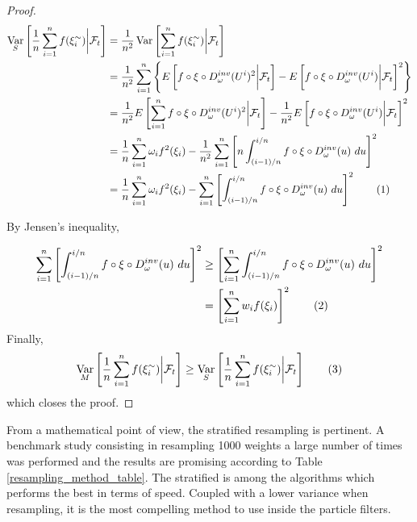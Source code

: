 \documentclass[11pt,a4,twosided,singlespacing,titlepagenumber=on]{scrreprt}
\numberwithin{equation}{chapter} %
\theoremstyle{remark}
\DeclareMathOperator{\var}{Var}
\newcommand\numberthis{\addtocounter{equation}{1}\tag{\theequation}}
\begin{document}
\begin{proof}
\begin{align*}
\var_S \left[ \frac{1}{n} \sum_{i=1}^n f(\xi_i^\sim) \bigg| \mathcal{F}_t \right] &= \frac{1}{n^2} \var \left[ \sum_{i=1}^n f(\xi_i^\sim) \bigg| \mathcal{F}_t \right] \\
																					  &= \frac{1}{n^2} \sum_{i=1}^n \left\{ E \left[ f \circ \xi \circ D_\omega^{inv}(U^i)^2 \bigg| \mathcal{F}_t \right] - E \left[ f \circ \xi \circ D_\omega^{inv}(U^i) \bigg| \mathcal{F}_t \right]^2 \right\}\\
																					  &= \frac{1}{n^2} E \left[ \sum_{i=1}^n f \circ \xi \circ D_\omega^{inv}(U^i)^2 \bigg| \mathcal{F}_t \right] - \frac{1}{n^2} E \left[ f \circ \xi \circ D_\omega^{inv}(U^i) \bigg| \mathcal{F}_t \right]^2 \\
																					  &= \frac{1}{n} \sum_{i=1}^n \omega_i f^2(\xi_i) - \frac{1}{n^2} \sum_{i=1}^n \left[ n \int_{(i-1)/n}^{i/n} f \circ \xi \circ D_\omega^{inv}(u)\text{ }du\right]^2 \\
																					  &= \frac{1}{n} \sum_{i=1}^n \omega_i f^2(\xi_i) - \sum_{i=1}^n \left[ \int_{(i-1)/n}^{i/n} f \circ \xi \circ D_\omega^{inv}(u)\text{ }du\right]^2 \numberthis
\end{align*}

By Jensen's inequality,

\begin{align*}
\sum_{i=1}^n \left[ \int_{(i-1)/n}^{i/n} f \circ \xi \circ D_\omega^{inv}(u)\text{ }du\right]^2 &\geq \left[\sum_{i=1}^n \int_{(i-1)/n}^{i/n} f \circ \xi \circ D_\omega^{inv}(u)\text{ }du\right]^2 \\
																									&= \left[ \sum_{i=1}^n w_i f(\xi_i)\right]^2 \numberthis
\end{align*}
Finally,
\begin{equation}
\var_M \left[ \frac{1}{n} \sum_{i=1}^n f(\xi_i^\sim) \bigg| \mathcal{F}_t \right] \geq \var_S \left[ \frac{1}{n} \sum_{i=1}^n f(\xi_i^\sim) \bigg| \mathcal{F}_t \right] \numberthis
\end{equation}
which closes the proof.
\end{proof}


From a mathematical point of view, the stratified resampling is pertinent. A benchmark study consisting in resampling 1000 weights a large number of times was performed and the results are promising according to Table \ref{resampling_method_table}. The stratified is among the algorithms which performs the best in terms of speed. Coupled with a lower variance when resampling, it is the most compelling method to use inside the particle filters. 
\end{document}
